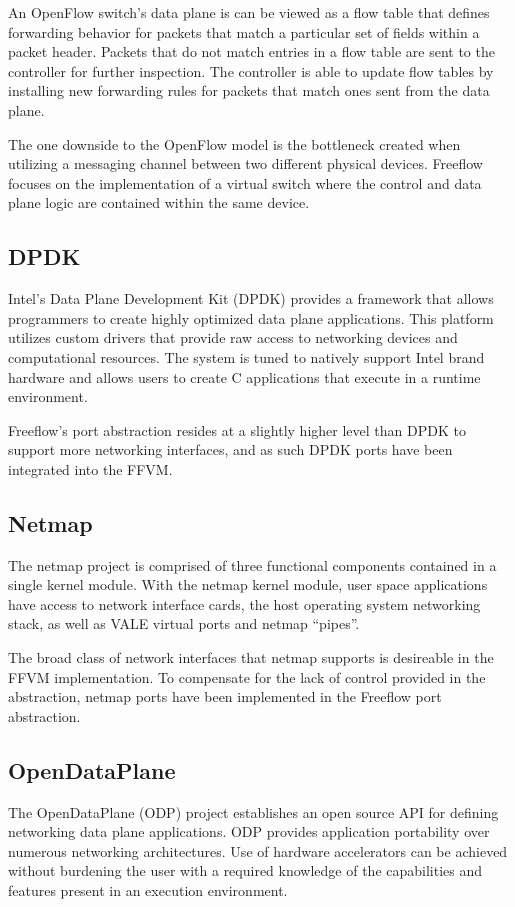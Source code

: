 An OpenFlow switch's data plane is can be viewed as a flow table that defines
forwarding behavior for packets that match a particular set of fields within
a packet header. Packets that do not match entries in a flow table are sent
to the controller for further inspection. The controller is able to update flow
tables by installing new forwarding rules for packets that match ones sent
from the data plane.

The one downside to the OpenFlow model is the bottleneck created when utilizing
a messaging channel between two different physical devices. Freeflow focuses
on the implementation of a virtual switch where the control and data plane
logic are contained within the same device.

\subsection{DPDK}
\label{related:dpdk}
Intel's Data Plane Development Kit (DPDK) \cite{dpdk} provides a framework that
allows programmers to create highly optimized data plane applications. This
platform utilizes custom drivers that provide raw access to networking devices
and computational resources. The system is tuned to natively support Intel
brand hardware and allows users to create C applications that execute in
a runtime environment. 

Freeflow's port abstraction resides at a slightly higher level than DPDK to support more networking interfaces, and as such DPDK ports have been integrated into the FFVM.

\subsection{Netmap}
\label{related:netmap}
The netmap project \cite{netmap} is comprised of three functional components
contained in a single kernel module. With the netmap kernel module, user space
applications have access to network interface cards, the host operating system
networking stack, as well as VALE virtual ports and netmap ``pipes''. 

The broad class of network interfaces that netmap supports is desireable in the FFVM implementation. To compensate for the lack of control provided in the abstraction, netmap ports have been implemented in the Freeflow port abstraction.

\subsection{OpenDataPlane}
\label{related:odp}
The OpenDataPlane (ODP) project \cite{odp} establishes an open source API for
defining networking data plane applications. ODP provides application
portability over numerous networking architectures. Use of hardware
accelerators can be achieved without burdening the user with a required
knowledge of the capabilities and features present in an execution environment. 

